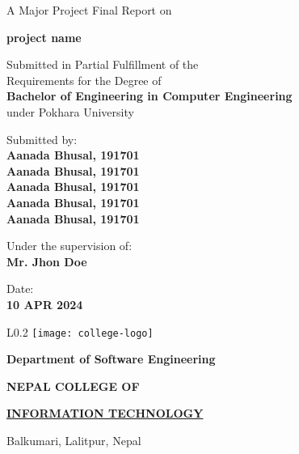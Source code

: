 \documentclass[12pt, a4paper]{report}
\begin{document}
\begin{titlepage}
	\begin{center}
	
	\large%
	A Major Project Final Report on
	
	\huge %
	\textbf{project name}

	\vfill
	
	\large %
	Submitted in Partial Fulfillment of the \\ 
	Requirements for the Degree of \\ 
	\textbf {Bachelor of Engineering in Computer Engineering} \\
	under Pokhara University
	
	\vfill
	
	Submitted by: \\ 
	\textbf {Aanada Bhusal, 191701} \\
	\textbf {Aanada Bhusal, 191701} \\
	\textbf {Aanada Bhusal, 191701} \\
	\textbf {Aanada Bhusal, 191701} \\
	\textbf {Aanada Bhusal, 191701} \\
	
	\vfill
	
	Under the supervision of: \\
	\textbf {Mr. Jhon Doe}
	
	\vfill
	
	Date: \\
	\textbf {10 APR 2024}
	
	\vfill
	
	\end{center}
	
	\begin{wrapfigure}{L}{0.2\textwidth}
	\centering
	\texttt{[image: college-logo]}
	\end{wrapfigure}
	
	\selectfont
	
	\textbf {Department of Software Engineering}  
	
	\Large %
	\textbf {NEPAL COLLEGE OF} 
	
	\LARGE %
	\textbf {\underline {INFORMATION TECHNOLOGY} }
	
	\small %
	Balkumari, Lalitpur, Nepal
	
	
\end{titlepage}
\end{document}

